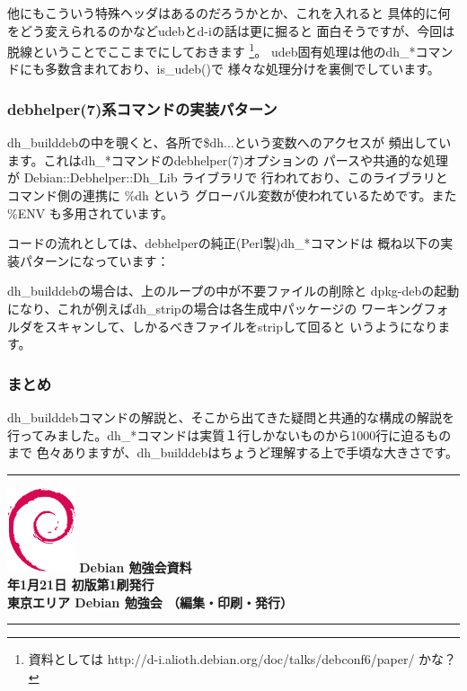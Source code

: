 \documentclass[mingoth,a4paper]{jsarticle}
\newcommand{\debmtgyear}{2012}
\newcommand{\debmtgmonth}{1}
\newcommand{\debmtgdate}{21}
\begin{document}
他にもこういう特殊ヘッダはあるのだろうかとか、これを入れると
具体的に何をどう変えられるのかなどudebとd-iの話は更に掘ると
面白そうですが、今回は脱線ということでここまでにしておきます
\footnote{
資料としては http://d-i.alioth.debian.org/doc/talks/debconf6/paper/ かな？
}。
udeb固有処理は他のdh\_*コマンドにも多数含まれており、is\_udeb()で
様々な処理分けを裏側でしています。

\subsubsection{debhelper(7)系コマンドの実装パターン}
dh\_builddebの中を覗くと、各所で\$dh{...}という変数へのアクセスが
頻出しています。これはdh\_*コマンドのdebhelper(7)オプションの
パースや共通的な処理が Debian::Debhelper::Dh\_Lib ライブラリで
行われており、このライブラリとコマンド側の連携に \%dh という
グローバル変数が使われているためです。また \%ENV も多用されています。

コードの流れとしては、debhelperの純正(Perl製)dh\_*コマンドは
概ね以下の実装パターンになっています：


dh\_builddebの場合は、上のループの中が不要ファイルの削除と
dpkg-debの起動になり、これが例えばdh\_stripの場合は各生成中パッケージの
ワーキングフォルダをスキャンして、しかるべきファイルをstripして回ると
いうようになります。

\subsubsection{まとめ}
dh\_builddebコマンドの解説と、そこから出てきた疑問と共通的な構成の解説を
行ってみました。dh\_*コマンドは実質１行しかないものから1000行に迫るものまで
色々ありますが、dh\_builddebはちょうど理解する上で手頃な大きさです。

\printindex

\cleartooddpage

\vspace*{15cm}
\hrule
\vspace{2mm}
\includegraphics[width=2cm]{image200502/openlogo-nd.eps}
\noindent \Large \bf Debian 勉強会資料\\
\noindent \normalfont \debmtgyear{}年\debmtgmonth{}月\debmtgdate{}日 \hspace{5mm}  初版第1刷発行\\
\noindent \normalfont 東京エリア Debian 勉強会 （編集・印刷・発行）\\
\hrule
\end{document}
